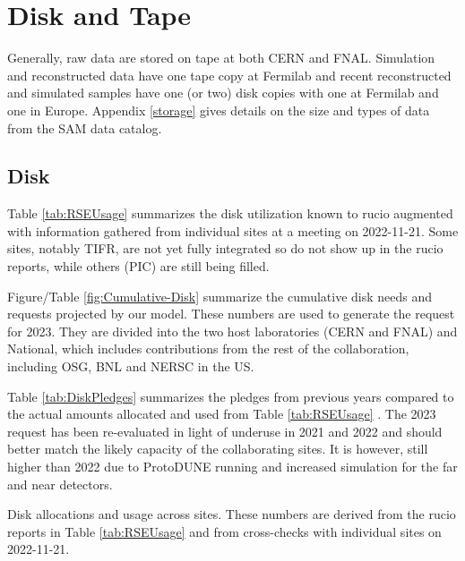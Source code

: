 \documentclass[12pt]{article}
\begin{document}
\section{Disk and Tape}

Generally, raw data are stored on tape at both CERN and FNAL.  Simulation and reconstructed data  have one tape copy at Fermilab and recent reconstructed and simulated samples have one (or two) disk copies with one at Fermilab and one in Europe.  Appendix \ref{storage} gives details on the size and types of data from the SAM data catalog.

\subsection{Disk}
Table \ref{tab:RSEUsage} summarizes the disk utilization known to rucio augmented with information gathered from individual sites at a meeting on 2022-11-21.  Some sites, notably TIFR, are not yet fully integrated so do not show up in the rucio reports, while others (PIC) are still being filled.  

Figure/Table  \ref{fig:Cumulative-Disk}  summarize the cumulative disk needs and requests projected by our model. These numbers are used to generate the request for 2023.  They are divided into the two host laboratories (CERN and FNAL) and National, which includes contributions from the rest of the collaboration, including OSG, BNL and NERSC in the US. 

Table \ref{tab:DiskPledges} summarizes the pledges from previous years compared to the actual amounts allocated and used from Table \ref{tab:RSEUsage} .   The 2023 request has been re-evaluated in light of underuse in 2021 and 2022 and should better match the likely capacity of the collaborating sites.  It is however, still higher than 2022 due to ProtoDUNE running and increased simulation for the far and near detectors. 

\begin{table}[ht]
\centering{}
\caption{Disk allocations and usage across sites.    These numbers are derived from the rucio reports in Table \ref{tab:RSEUsage} and from cross-checks with individual sites on 2022-11-21. }
\label{tab:RSEUsage}
\end{table}
\end{document}
